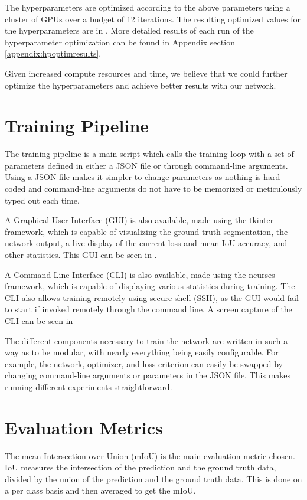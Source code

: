 The hyperparameters are optimized according to the above parameters using a cluster of  GPUs over a budget of 12 iterations.
The resulting optimized values for the hyperparameters are in .
More detailed results of each run of the hyperparameter optimization can be found in Appendix section \ref{appendix:hpoptimresults}.

Given increased compute resources and time, we believe that we could further optimize the hyperparameters and achieve better results with our network.



\section{Training Pipeline} \label{section:experiments-trainingpipeline}
The training pipeline is a main script which calls the training loop with a set of parameters defined in either a JSON file or through command-line arguments.
Using a JSON file makes it simpler to change parameters as nothing is hard-coded and command-line arguments do not have to be memorized or meticulously typed out each time.

A Graphical User Interface (GUI) is also available, made using the tkinter framework, which is capable of visualizing the ground truth segmentation, the network output, a live display of the current loss and mean IoU accuracy, and other statistics.
This GUI can be seen in .

A Command Line Interface (CLI) is also available, made using the ncurses framework, which is capable of displaying various statistics during training.
The CLI also allows training remotely using secure shell (SSH), as the GUI would fail to start if invoked remotely through the command line.
A screen capture of the CLI can be seen in 



The different components necessary to train the network are written in such a way as to be modular, with nearly everything being easily configurable.
For example, the network, optimizer, and loss criterion can easily be swapped by changing command-line arguments or parameters in the JSON file.
This makes running different experiments straightforward.

\section{Evaluation Metrics} \label{section:experiments-evaluationmetrics}
The mean Intersection over Union (mIoU) is the main evaluation metric chosen.
IoU measures the intersection of the prediction and the ground truth data, divided by the union of the prediction and the ground truth data.
This is done on a per class basis and then averaged to get the mIoU.


